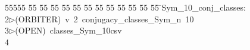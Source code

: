 %
%
\begin{tabbing}
55555 \= 55 \= 55 \= 55 \= 55 \= 55 \= 55 \= 55 \= 55 \= 55 \= 55 \= 55 \= 55 \= \>Sym\_10\_conj\_classes:\\[0pt]
2\>$\triangleright$\>(ORBITER)\ v\ 2\ conjugacy\_classes\_Sym\_n\ 10\\[0pt]
3\>$\triangleright$\>(OPEN)\ classes\_Sym\_10csv\\[0pt]
4\>\end{tabbing}
